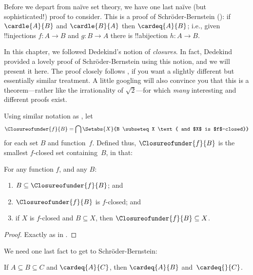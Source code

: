 \documentclass[../../../include/open-logic-section]{subfiles}
\begin{document}


Before we depart from na\"ive set theory, we have one last na\"ive
(but sophisticated!) proof to consider. This is a proof of
Schr\"oder-Bernstein (): if
$\cardle{A}{B}$ and $\cardle{B}{A}$ then $\cardeq{A}{B}$; i.e., given
!!{injection}s $f \colon A \to B$ and $g \colon B \to A$ there is
!!a{bijection} $h \colon A \to B$. 

In this chapter, we followed Dedekind's notion of \emph{closures}. In
fact, Dedekind provided a lovely proof of Schr\"oder-Bernstein using this notion, and we
will present it here. The proof closely follows
\citet[pp.~157--8]{Potter2004}, if you want a slightly different but
essentially similar treatment. A little googling will also convince
you that this is a theorem---rather like the irrationality of
$\sqrt{2}$---for which \emph{many} interesting and different proofs
exist.

Using similar notation as ,
let
\[
\Closureofunder{f}{B} = \bigcap \Setabs{X}{B \subseteq X 
\text{ and $X$ is $f$-closed}}
\]
for each set $B$ and function~$f$. Defined thus,
$\Closureofunder{f}{B}$ is the smallest $f$-closed set containing~$B$,
in that:

\begin{lem}
	For any function $f$, and any $B$:
	\begin{enumerate}
		\item{} $B \subseteq \Closureofunder{f}{B}$; and
		\item{} $\Closureofunder{f}{B}$ is $f$-closed; and
		\item{} if $X$ is $f$-closed and $B
		\subseteq X$, then $\Closureofunder{f}{B} \subseteq X$.
	\end{enumerate}
\end{lem}

\begin{proof}
Exactly as in .
\end{proof}

We need one last fact to get to Schr\"oder-Bernstein:

\begin{prop}
If $A \subseteq B \subseteq C$ and $\cardeq{A}{C}$, then $\cardeq{A}{B}$ and~$\cardeq{}{C}$.
\end{prop}
\end{document}

